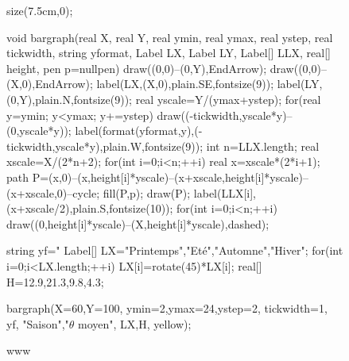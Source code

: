 \documentclass[a4paper]{book}
\begin{document}
\begin{figure}[!ht]
	\centering
	\begin{asy}
	size(7.5cm,0);

void bargraph(real X, real Y,
              real ymin, real ymax, real ystep,
              real tickwidth, string yformat,
              Label LX, Label LY, Label[] LLX,
              real[] height,
              pen p=nullpen){
    draw((0,0)--(0,Y),EndArrow);
    draw((0,0)--(X,0),EndArrow);
    label(LX,(X,0),plain.SE,fontsize(9));
    label(LY,(0,Y),plain.N,fontsize(9));
    real yscale=Y/(ymax+ystep);
    for(real y=ymin; y<ymax; y+=ystep) {
        draw((-tickwidth,yscale*y)--(0,yscale*y));
        label(format(yformat,y),(-tickwidth,yscale*y),plain.W,fontsize(9));
    }
    int n=LLX.length;
    real xscale=X/(2*n+2);
    for(int i=0;i<n;++i) {
        real x=xscale*(2*i+1);
        path P=(x,0)--(x,height[i]*yscale)--(x+xscale,height[i]*yscale)--(x+xscale,0)--cycle;
        fill(P,p);
        draw(P);
        label(LLX[i],(x+xscale/2),plain.S,fontsize(10));
    }
    for(int i=0;i<n;++i)
        draw((0,height[i]*yscale)--(X,height[i]*yscale),dashed);
}

string yf="%
Label[] LX={"Printemps","Et\'e","Automne","Hiver"};
for(int i=0;i<LX.length;++i) LX[i]=rotate(45)*LX[i];
real[] H={12.9,21.3,9.8,4.3};

bargraph(X=60,Y=100,
         ymin=2,ymax=24,ystep=2,
         tickwidth=1,
         yf,
         "Saison","$\theta$ moyen",
         LX,H,
         yellow);
	\end{asy}
	\caption{www}
\end{figure}
\end{document}
